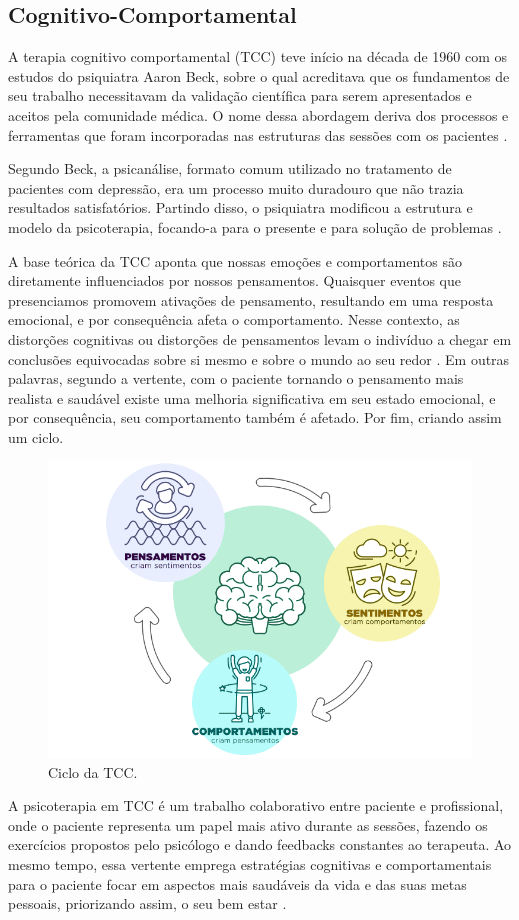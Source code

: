 \subsection{Cognitivo-Comportamental}
\label{sec:cognitivoComportamental}
A terapia cognitivo comportamental (TCC) teve início na década de 1960 com os estudos do psiquiatra Aaron Beck, sobre o qual acreditava que os fundamentos de seu trabalho necessitavam da validação científica para serem apresentados e aceitos pela comunidade médica. O nome dessa abordagem deriva dos processos e ferramentas que foram incorporadas nas estruturas das sessões com os pacientes \cite{Barros2022}.

Segundo Beck, a psicanálise, formato comum utilizado no tratamento de pacientes com depressão, era um processo muito duradouro que não trazia resultados satisfatórios. Partindo disso, o psiquiatra modificou a estrutura e modelo da psicoterapia, focando-a para o presente e para solução de problemas \cite{Barros2022}.

A base teórica da TCC aponta que nossas emoções e comportamentos são diretamente influenciados por nossos pensamentos. Quaisquer eventos que presenciamos promovem ativações de pensamento, resultando em uma resposta emocional, e por consequência afeta o comportamento. Nesse contexto, as distorções cognitivas ou distorções de pensamentos levam o indivíduo a chegar em conclusões equivocadas sobre si mesmo e sobre o mundo ao seu redor \cite{Barros2022}. Em outras palavras, segundo a vertente, com o paciente tornando o pensamento mais realista e saudável existe uma melhoria significativa em seu estado emocional, e por consequência, seu comportamento também é afetado. Por fim, criando assim um ciclo. 

\begin{figure}[H]
    \centering
    \caption{Ciclo da TCC.}
    \label{fig:cicloTCC}
    \includegraphics[width=.8\textwidth]{data/figures/tcc-esquema.png}
\end{figure}

A psicoterapia em TCC é um trabalho colaborativo entre paciente e profissional, onde o paciente representa um papel mais ativo durante as sessões, fazendo os exercícios propostos pelo psicólogo e dando feedbacks constantes ao terapeuta. Ao mesmo tempo, essa vertente emprega estratégias cognitivas e comportamentais para o paciente focar em aspectos mais saudáveis da vida e das suas metas pessoais, priorizando assim, o seu bem estar \cite{Barros2022}.